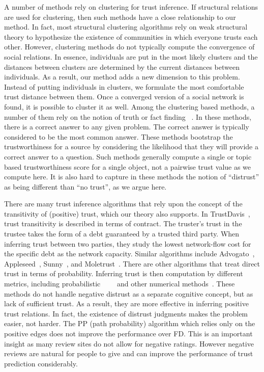\documentclass[acmtweb]{acmsmall}
\begin{document}
A number of methods rely on clustering for trust inference. If
structural relations are used for clustering, then such methods have a
close relationship to our method. In fact, most structural clustering
algorithms rely on weak structural theory to hypothesize the existence
of communities in which everyone trusts each other. However,
clustering methods do not typically compute the convergence of social
relations. In essence, individuals are put in the most likely clusters
and the distances between clusters are determined by the current
distances between individuals. As a result, our method adds a new
dimension to this problem. Instead of putting individuals in clusters,
we formulate the most comfortable trust distance between them. Once a
converged version of a social network is found, it is possible to
cluster it as well. Among the clustering based methods, a number of
them rely on the notion of truth or fact
finding~\cite{Balakrishnan:2011} \cite{Le:2011} \cite{Sun:2011}
\cite{Yin:2008}. In these methods, there is a correct answer to any
given problem. The correct answer is typically considered to be the
most common answer. These methods bootstrap the trustworthiness for a
source by considering the likelihood that they will provide a correct
answer to a question. Such methods generally compute a single or topic
based trustworthiness score for a single object, not a pairwise trust
value as we compute here. It is also hard to capture in these methods
the notion of ``distrust'' as being different than ``no trust'', as we
argue here.

There are many trust inference algorithms that rely upon the concept
of the transitivity of (positive) trust, which our theory also
supports. In TrustDavis~\cite{trustdavis}, trust transitivity is
described in terms of contract. The truster's trust in the trustee
takes the form of a debt guaranteed by a trusted third party. When
inferring trust between two parties, they study the lowest
network-flow cost for the specific debt as the network
capacity. Similar algorithms include Advogato~\cite{advogato},
Appleseed~\cite{appleseed}, Sunny~\cite{sunny}, and
Moletrust~\cite{moletrust}. There are other algorithms that treat
direct trust in terms of probability. Inferring trust is then
computation by different metrics, including
probabilistic~\cite{DuBois:2009}~\cite{Singh08}~\cite{patel05}~\cite{josang06}
and other numerical methods~\cite{Yao:2013}.  These methods do not
handle negative distrust as a separate cognitive concept, but as lack
of sufficient trust. As a result, they are more effective in inferring
positive trust relations. In fact, the existence of distrust judgments
makes the problem easier, not harder. The PP (path probability)
algorithm which relies only on the positive edges does not improve the
performance over FD. This is an important insight as many review sites
do not allow for negative ratings. However negative reviews are
natural for people to give and can improve the performance of trust
prediction considerably.
\end{document}
